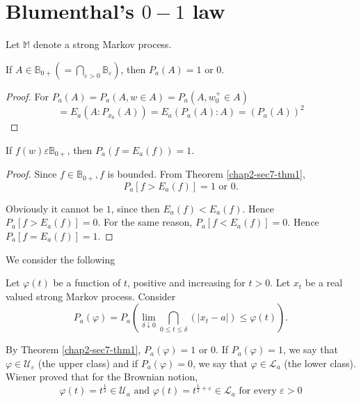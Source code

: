 \section{Blumenthal's $0-1$ law}\label{chap2-sec7}

Let $\mathbb{M}$ denote a strong Markov process.

\setcounter{thm}{0}
\begin{thm}\label{chap2-sec7-thm1}%
If $A \in \mathbb{B}_{0+} (= \bigcap\limits_{ \varepsilon >
    0} \mathbb{B}_\varepsilon)$, then $P_a (A) =1$ or $0$. 
\end{thm}

\begin{proof}
  For $P_a (A) = P_a (A, w \in A) = P_a (A, w^+_0 \in A)$
  $$
  =E_a (A : P_{x_0} (A)) = E_a (P_a (A) : A) = (P_a (A))^2
  $$
\end{proof}

\begin{thm}\label{chap2-sec7-thm2}%
  If $f (w) \varepsilon \mathbb{B}_{0+}$, then $P_a (f = E_a (f)) = 1$.
\end{thm}

\begin{proof}
  Since $f \in \mathbb{B}_{0+}, f$ is bounded. From Theorem
  \ref{chap2-sec7-thm1}, 
  $$
  P_a [f > E_a (f)] = 1 \text { or } 0.
  $$

  Obviously it cannot be $1$, since then $E_a(f) < E_a (f)$. Hence
  $P_a [f > E_a (f)] = 0$. For the same reason, $P_a [f < E_a (f)]
  =0$. Hence $P_a [f = E_a (f)] = 1$. 
\end{proof}

We consider the following
\begin{example*}
  Let $\varphi (t)$ be a function of $t$, positive and increasing for
  $t > 0$. Let  $x_t$ be a real valued strong Markov process. Consider 
  $$
  P_a (\varphi) = P_a \left(\lim_{\delta \downarrow 0} \bigcap_{0 \le
    t \le 
    \delta} (|x_t-a|) \le \varphi (t)\right). 
  $$\pageoriginale
\end{example*}

By Theorem \ref{chap2-sec7-thm1}, $P_a (\varphi) = 1$ or $0$. If $P_a
(\varphi) = 1$, we 
say that $\varphi \in  \mathscr{U}_\varepsilon$ (the upper
class) and if $P_a (\varphi) =0$, we say that $\varphi \in
\mathcal{L}_a$ (the lower class). Wiener proved that for the Brownian
notion, 
$$
\varphi (t) = t^{\frac{1}{2}} \in \mathscr{U}_a \text{ and }
\varphi (t) = t^{\frac{1}{2}+ \varepsilon} \in \mathcal{L}_a
\text{ for every } \varepsilon > 0 
$$

